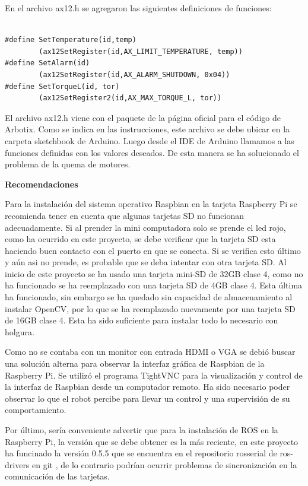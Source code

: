 \begin{itemize}
En el archivo ax12.h se agregaron las siguientes definiciones de funciones:

\begin{lstlisting}

#define SetTemperature(id,temp) 
		(ax12SetRegister(id,AX_LIMIT_TEMPERATURE, temp))
#define SetAlarm(id)
		(ax12SetRegister(id,AX_ALARM_SHUTDOWN, 0x04))
#define SetTorqueL(id, tor)
		(ax12SetRegister2(id,AX_MAX_TORQUE_L, tor)) 
\end{lstlisting}
 

El archivo ax12.h viene con el paquete de la p\'agina oficial para el código de Arbotix. Como se indica en las instrucciones, este archivo se debe ubicar en la carpeta sketchbook de Arduino. Luego desde el IDE de Arduino llamamos a las funciones definidas con los valores deseados. De esta manera se ha solucionado el problema de la quema de motores.

\end{itemize}

\textbf{Recomendaciones}  

Para la instalación del sistema operativo Raspbian en la tarjeta Raspberry Pi se recomienda tener en cuenta que algunas tarjetas SD no funcionan adecuadamente. Si al prender la mini computadora solo se prende el led rojo, como ha ocurrido en este proyecto, se debe verificar que la tarjeta SD esta haciendo buen contacto con el puerto en que se conecta. Si se verifica esto último y aún asi no prende, es probable que se deba intentar con otra tarjeta SD. Al inicio de este proyecto se ha usado una tarjeta mini-SD de 32GB clase 4, como no ha funcionado se ha reemplazado con una tarjeta SD de 4GB clase 4. Esta última ha funcionado, sin embargo se ha quedado sin capacidad de almacenamiento al instalar OpenCV, por lo que se ha reemplazado nuevamente por una tarjeta SD de 16GB clase 4. Esta ha sido suficiente para instalar todo lo necesario con holgura.    

Como no se contaba con un monitor con entrada HDMI o VGA se debió buscar una solución alterna para observar la interfaz gráfica de Raspbian de la Raspberry Pi. Se utilizó el programa TightVNC para la visualización y control de la interfaz de Raspbian desde un computador remoto. Ha sido necesario poder observar lo que el robot percibe para llevar un control y una supervisión de su comportamiento. 

Por último, sería conveniente advertir que para la instalación de ROS en la Raspberry Pi, la versión que se debe obtener es la más reciente, en este proyecto ha funcinado la versión 0.5.5 que se encuentra en el repositorio rosserial de ros-drivers en git \cite{rosDrivers}, de lo contrario podrían ocurrir problemas de sincronización en la comunicación de las tarjetas.   



